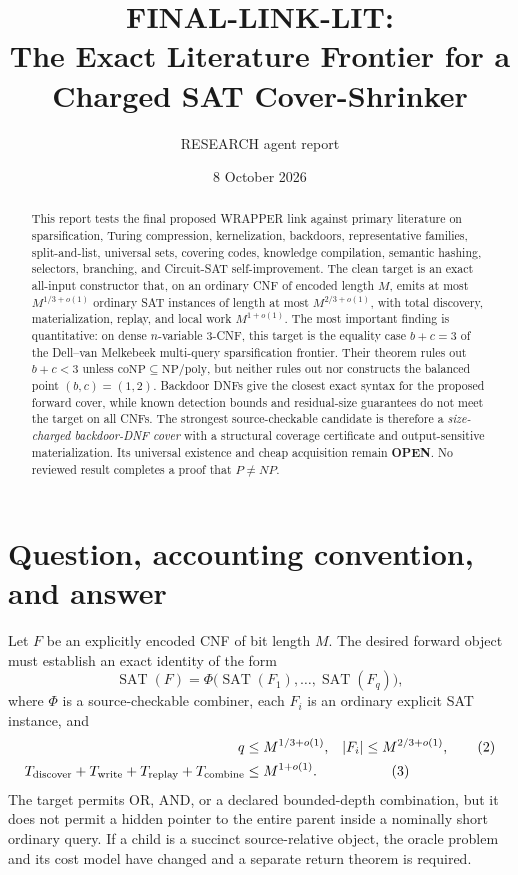 \documentclass[11pt]{article}
\title{FINAL-LINK-LIT:\\The Exact Literature Frontier for a Charged SAT Cover-Shrinker}
\author{RESEARCH agent report}
\date{8 October 2026}
\newcommand{\SAT}{\operatorname{SAT}}
\begin{document}
\maketitle

\begin{abstract}
This report tests the final proposed WRAPPER link against primary literature
on sparsification, Turing compression, kernelization, backdoors,
representative families, split-and-list, universal sets, covering codes,
knowledge compilation, semantic hashing, selectors, branching, and
Circuit-SAT self-improvement.  The clean target is an exact all-input
constructor that, on an ordinary CNF of encoded length $M$, emits at most
$M^{1/3+o(1)}$ ordinary SAT instances of length at most
$M^{2/3+o(1)}$, with total discovery, materialization, replay, and local work
$M^{1+o(1)}$.  The most important finding is quantitative: on dense
$n$-variable $3$-CNF, this target is the equality case $b+c=3$ of the
Dell--van Melkebeek multi-query sparsification frontier.  Their theorem rules
out $b+c<3$ unless $\mathrm{coNP}\subseteq\mathrm{NP/poly}$, but neither
rules out nor constructs the balanced point $(b,c)=(1,2)$.  Backdoor DNFs
give the closest exact syntax for the proposed forward cover, while known
detection bounds and residual-size guarantees do not meet the target on all
CNFs.  The strongest source-checkable candidate is therefore a
\emph{size-charged backdoor-DNF cover} with a structural coverage
certificate and output-sensitive materialization.  Its universal existence
and cheap acquisition remain \textbf{OPEN}.  No reviewed result completes a
proof that $P\ne NP$.
\end{abstract}

\section{Question, accounting convention, and answer}

Let $F$ be an explicitly encoded CNF of bit length $M$.  The desired forward
object must establish an exact identity of the form
\begin{equation}
  \SAT(F)=\Phi\bigl(\SAT(F_1),\ldots,\SAT(F_q)\bigr),
  \tag{1}
\end{equation}
where $\Phi$ is a source-checkable combiner, each $F_i$ is an ordinary
explicit SAT instance, and
\begin{align}
 q&\le M^{1/3+o(1)},
 & |F_i|&\le M^{2/3+o(1)}, \tag{2}\\
 T_{\rm discover}+T_{\rm write}+T_{\rm replay}+T_{\rm combine}
   &\le M^{1+o(1)}.
 && \tag{3}
\end{align}
The target permits OR, AND, or a declared bounded-depth combination, but it
does not permit a hidden pointer to the entire parent inside a nominally
short ordinary query.  If a child is a succinct source-relative object, the
oracle problem and its cost model have changed and a separate return theorem
is required.
\end{document}
